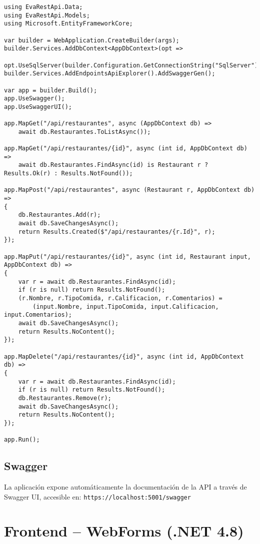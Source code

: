 \documentclass[12pt,a4paper]{report}
\begin{document}
\begin{lstlisting}[language={[Sharp]C}]
using EvaRestApi.Data;
using EvaRestApi.Models;
using Microsoft.EntityFrameworkCore;

var builder = WebApplication.CreateBuilder(args);
builder.Services.AddDbContext<AppDbContext>(opt =>
    opt.UseSqlServer(builder.Configuration.GetConnectionString("SqlServer")));
builder.Services.AddEndpointsApiExplorer().AddSwaggerGen();

var app = builder.Build();
app.UseSwagger();
app.UseSwaggerUI();

app.MapGet("/api/restaurantes", async (AppDbContext db) =>
    await db.Restaurantes.ToListAsync());

app.MapGet("/api/restaurantes/{id}", async (int id, AppDbContext db) =>
    await db.Restaurantes.FindAsync(id) is Restaurant r ? Results.Ok(r) : Results.NotFound());

app.MapPost("/api/restaurantes", async (Restaurant r, AppDbContext db) =>
{
    db.Restaurantes.Add(r);
    await db.SaveChangesAsync();
    return Results.Created($"/api/restaurantes/{r.Id}", r);
});

app.MapPut("/api/restaurantes/{id}", async (int id, Restaurant input, AppDbContext db) =>
{
    var r = await db.Restaurantes.FindAsync(id);
    if (r is null) return Results.NotFound();
    (r.Nombre, r.TipoComida, r.Calificacion, r.Comentarios) =
        (input.Nombre, input.TipoComida, input.Calificacion, input.Comentarios);
    await db.SaveChangesAsync();
    return Results.NoContent();
});

app.MapDelete("/api/restaurantes/{id}", async (int id, AppDbContext db) =>
{
    var r = await db.Restaurantes.FindAsync(id);
    if (r is null) return Results.NotFound();
    db.Restaurantes.Remove(r);
    await db.SaveChangesAsync();
    return Results.NoContent();
});

app.Run();
\end{lstlisting}

\section{Swagger}

La aplicación expone automáticamente la documentación de la API a través de Swagger UI, accesible en:
\texttt{https://localhost:5001/swagger}


\chapter{Frontend – WebForms (.NET 4.8)}
\end{document}
